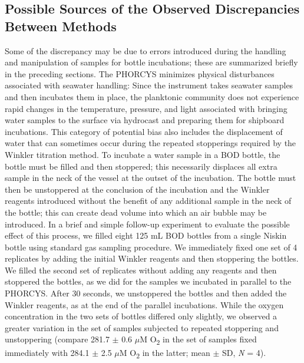 \subsection{Possible Sources of the Observed Discrepancies Between Methods}
Some of the discrepancy may be due to errors introduced during the handling and manipulation of samples for bottle incubations; these are summarized briefly in the preceding sections. The PHORCYS minimizes physical disturbances associated with seawater handling: Since the instrument takes seawater samples and then incubates them in place, the planktonic community does not experience rapid changes in the temperature, pressure, and light associated with bringing water samples to the surface via hydrocast and preparing them for shipboard incubations. This category of potential bias also includes the displacement of water that can sometimes occur during the repeated stopperings required by the Winkler titration method. To incubate a water sample in a BOD bottle, the bottle must be filled and then stoppered; this necessarily displaces all extra sample in the neck of the vessel at the outset of the incubation. The bottle must then be unstoppered at the conclusion of the incubation and the Winkler reagents introduced without the benefit of any additional sample in the neck of the bottle; this can create dead volume into which an air bubble may be introduced. In a brief and simple follow-up experiment to evaluate the possible effect of this process, we filled eight 125 mL BOD bottles from a single Niskin bottle using standard gas sampling procedure. We immediately fixed one set of 4 replicates by adding the initial Winkler reagents and then stoppering the bottles. We filled the second set of replicates without adding any reagents and then stoppered the bottles, as we did for the samples we incubated in parallel to the PHORCYS. After 30 seconds, we unstoppered the bottles and then added the Winkler reagents, as at the end of the parallel incubations. While the oxygen concentration in the two sets of bottles differed only slightly, we observed a greater variation in the set of samples subjected to repeated stoppering and unstoppering (compare 281.7 $\pm$ 0.6 $\mu$M O\textsubscript{2} in the set of samples fixed immediately with 284.1 $\pm$ 2.5 $\mu$M O\textsubscript{2} in the latter; mean $\pm$ SD, \emph{N} = 4).


